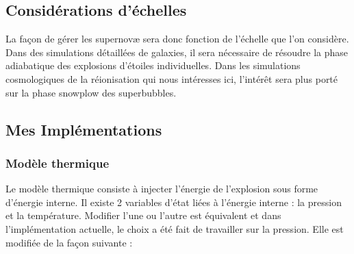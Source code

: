 \subsection{Considérations d'échelles}
La façon de gérer les supernovæ sera donc fonction de l'échelle que l'on considère.
Dans des simulations détaillées de galaxies, il sera nécessaire de résoudre la phase adiabatique des explosions d'étoiles individuelles. %
Dans les simulations cosmologiques de la réionisation qui nous intéresses ici, l’intérêt sera plus porté sur la phase snowplow des superbubbles.

%

\subsection{Mes Implémentations}
\label{sec:SNmodel}

\subsubsection{Modèle thermique}
Le modèle thermique consiste à injecter l’énergie de l'explosion sous forme d’énergie interne.
Il existe 2 variables d’état liées à l’énergie interne : la pression et la température.
Modifier l'une ou l'autre est équivalent et dans l’implémentation actuelle, le choix a été fait de travailler sur la pression.
Elle est modifiée de la façon suivante :

